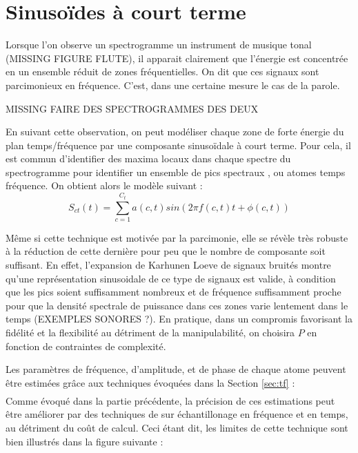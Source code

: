 \section{ \nmu Sinusoïdes à court terme}  \label{sec:sct}

Lorsque l'on observe un spectrogramme un instrument de musique tonal (MISSING FIGURE FLUTE), il apparait clairement que l'énergie est concentrée en un ensemble réduit de zones fréquentielles. On dit que ces signaux sont parcimonieux en fréquence. C'est, dans une certaine mesure le cas de la parole.

MISSING FAIRE DES SPECTROGRAMMES DES DEUX

En suivant cette observation, on peut modéliser chaque zone de forte énergie du plan temps/fréquence par une composante sinusoïdale à court terme. Pour cela, il est commun d'identifier des maxima locaux dans chaque spectre du spectrogramme pour identifier un ensemble de \og pics spectraux \fg, ou \og atomes \fg temps fréquence. On obtient alors le modèle suivant :
\begin{equation}
  S_{ct}(t) = \sum_{c=1}^{C_t} a(c,t) sin(2 \pi f(c,t) t + \phi(c,t))
\end{equation}

Même si cette technique est motivée par la parcimonie, elle se révèle très robuste à la réduction de cette dernière pour peu que le nombre de composante soit suffisant. En effet, l'expansion de Karhunen Loeve de signaux bruités montre qu'une représentation sinusoidale de ce type de signaux est valide, à condition que les pics soient suffisamment nombreux et de fréquence suffisamment proche pour que la densité spectrale de puissance dans ces zones varie lentement dans le temps\cite{mcaulay} (EXEMPLES SONORES ?). En pratique, dans un compromis favorisant la fidélité et la flexibilité au détriment de la manipulabilité, on choisira $P$ en fonction de contraintes de complexité.

Les paramètres de fréquence, d'amplitude, et de phase de chaque atome peuvent être estimées grâce aux techniques évoquées dans la Section \ref{sec:tf} :
\begin{eqnarray}
\end{eqnarray}
Comme évoqué dans la partie précédente, la précision de ces estimations peut être améliorer par des techniques de sur échantillonage en fréquence et en temps, au détriment du coût de calcul. Ceci étant dit, les limites de cette technique sont bien illustrés dans la figure suivante :


